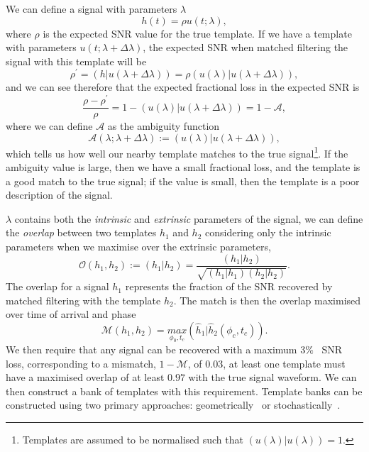 We can define a signal with parameters $\lambda$
%
\begin{equation}
    h(t) = \rho u(t;\lambda),
\end{equation}
where $\rho$ is the expected SNR value for the true template. If we have a template with parameters $u(t;\lambda + \Delta \lambda)$, the expected SNR when matched filtering the signal with this template will be
%
\begin{equation}
    \rho^{\prime} = (h|u(\lambda + \Delta \lambda)) = \rho(u(\lambda)|u(\lambda + \Delta \lambda)),
\end{equation}
%
and we can see therefore that the expected fractional loss in the expected SNR is
%
\begin{equation}
    \frac{\rho - \rho^{\prime}}{\rho} = 1 - (u(\lambda)|u(\lambda + \Delta \lambda)) = 1 - \mathcal{A},
\end{equation}
%
where we can define $\mathcal{A}$ as the ambiguity function
%
\begin{equation}
    \mathcal{A}(\lambda;\lambda + \Delta \lambda) := (u(\lambda)|u(\lambda + \Delta \lambda)),
\end{equation}
%
which tells us how well our nearby template matches to the true signal\footnote{Templates are assumed to be normalised such that $(u(\lambda)|u(\lambda)) = 1$.}. If the ambiguity value is large, then we have a small fractional loss, and the template is a good match to the true signal; if the value is small, then the template is a poor description of the signal.

$\lambda$ contains both the \textit{intrinsic} and \textit{extrinsic} parameters of the signal, we can define the \textit{overlap} between two templates $h_{1}$ and $h_{2}$ considering only the intrinsic parameters when we maximise over the extrinsic parameters,
%
\begin{equation}
    \mathcal{O}(h_{1}, h_{2}) := (h_{1} | h_{2}) = \frac{(h_{1} | h_{2})}{\sqrt{(h_{1} | h_{1})(h_{2} | h_{2})}}.
\end{equation}
%
The overlap for a signal $h_{1}$ represents the fraction of the SNR recovered by matched filtering with the template $h_{2}$. The match is then the overlap maximised over time of arrival and phase~\cite{Harry_Lundgren:2012}
%
\begin{equation}
    \mathcal{M}(h_{1}, h_{2}) = \underset{\phi_0, t_{c}}{max}(\hat{h}_{1}|\hat{h}_{2}(\phi_{c}, t_{c})).
\end{equation}
%
We then require that any signal can be recovered with a maximum $3\%$~\cite{Owen_Sathya:1999} SNR loss, corresponding to a mismatch, $1 - \mathcal{M}$, of $0.03$, at least one template must have a maximised overlap of at least $0.97$ with the true signal waveform. We can then construct a bank of templates with this requirement. Template banks can be constructed using two primary approaches: geometrically~\cite{geom_bank_1:1991, geom_bank_2:1992, geom_bank_3:1995, geom_bank_4:1995, Owen_Sathya:1999} or stochastically~\cite{Harry_sbank:2009, Stochastic_tb:2008}.

